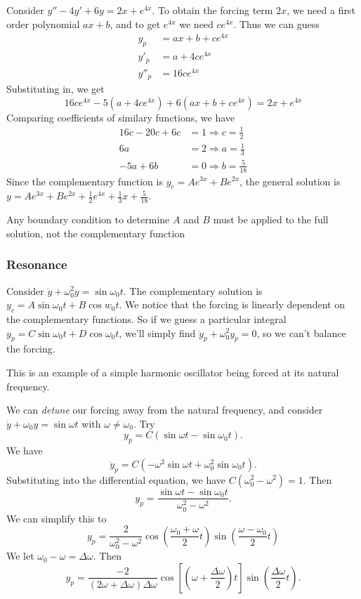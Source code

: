 \documentclass[a4paper]{article}
\begin{document}
\begin{eg}
  Consider $y'' - 4y' + 6y = 2x + e^{4x}$. To obtain the forcing term $2x$, we need a first order polynomial $ax + b$, and to get $e^{4x}$ we need $ce^{4x}$. Thus we can guess
  \begin{align*}
    y_p &= ax + b + ce^{4x}\\
    y'_p &= a + 4ce^{4x}\\
    y''_p &= 16ce^{4x}
  \end{align*}
  Substituting in, we get
  \[
  16ce^{4x} - 5(a + 4ce^{4x}) + 6(ax + b + ce^{4x}) = 2x + e^{4x}
  \]
  Comparing coefficients of similary functions, we have
  \begin{align*}
    16c - 20c + 6c &= 1\Rightarrow c = \frac{1}{2}\\
    6a &= 2 \Rightarrow a = \frac{1}{3}\\
    -5a + 6b &= 0 \Rightarrow b = \frac{5}{18}
  \end{align*}
  Since the complementary function is $y_c = Ae^{3x} + Be^{2x}$, the general solution is $y = Ae^{3x} + Be^{2x} + \frac{1}{2}e^{4x} + \frac{1}{3}x + \frac{5}{18}$.

\note Any boundary condition to determine $A$ and $B$ must be applied to the full solution, not the complementary function
\end{eg}
\subsubsection{Resonance}
Consider $\ddot y + \omega_0^2 y = \sin \omega_0 t$. The complementary solution is $y_c = A\sin \omega_0 t + B\cos w_0 t$. We notice that the forcing is linearly dependent on the complementary functions. So if we guess a particular integral $y_p = C\sin \omega_0 t + D\cos \omega_0 t$, we'll simply find $\ddot y_p + \omega_0 ^2 y_p = 0$, so we can't balance the forcing.

\note This is an example of a simple harmonic oscillator being forced at its natural frequency.

We can \emph{detune} our forcing away from the natural frequency, and consider $\ddot y + \omega_0 y = \sin \omega t$ with $\omega \not= \omega_0$. Try
\[
y_p = C(\sin \omega t - \sin \omega_0 t).
\]
We have
\[
\ddot y_p = C(-\omega^2 \sin \omega t + \omega_0^2 \sin\omega_0 t).
\]
Substituting into the differential equation, we have $C(\omega_0^2 - \omega^2) = 1$. Then 
\[
y_p = \frac{\sin \omega t - \sin \omega_0t}{\omega_0^2 - \omega^2}.
\]
We can simplify this to 
\[
y_p = \frac{2}{\omega_0^2 - \omega^2} \cos \left(\frac{\omega_0 + \omega}{2}t\right) \sin \left(\frac{\omega - \omega_0}{2} t\right)
\]
We let $\omega_0 - \omega = \Delta \omega$. Then
\[
y_p = \frac{-2}{(2\omega + \Delta \omega)\Delta \omega}\cos \left[\left(\omega + \frac{\Delta \omega}{2}\right)t\right] \sin \left(\frac{\Delta \omega}{2}t\right).
\]
\end{document}
